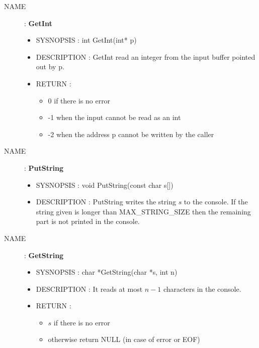 \begin{description}
    \item [NAME] : \textbf{GetInt}
        \begin{itemize}
            \item SYSNOPSIS : int GetInt(int* p)
            \item DESCRIPTION :
                GetInt read an integer from the input buffer pointed out by p.
            \item RETURN :
                \begin{itemize}
                    \item 0 if there is no error
                    \item -1 when the input cannot be read as an int
                    \item -2 when the address p cannot be written by the caller
                \end{itemize}
        \end{itemize}

    \item [NAME] : \textbf{PutString}
        \begin{itemize}
            \item SYSNOPSIS : void PutString(const char s[])
            \item DESCRIPTION :
                PutString writes the string $s$ to the console. If the string given is longer than
                MAX\_STRING\_SIZE then the remaining part is not printed in the console.
        \end{itemize}

    \item [NAME] : \textbf{GetString}
        \begin{itemize}
            \item SYSNOPSIS : char *GetString(char *s, int n)
            \item DESCRIPTION :
                It reads at most $n-1$ characters in the console.
            \item RETURN :
                \begin{itemize}
                    \item $s$ if there is no error
                    \item otherwise return NULL (in case of error or EOF)
                \end{itemize}
        \end{itemize}


\end{description}
